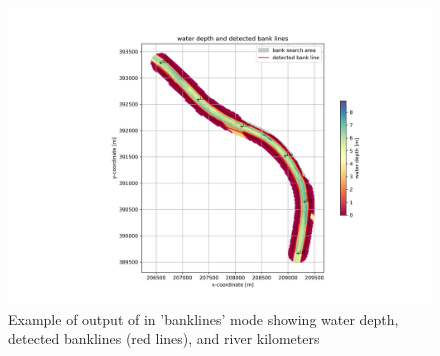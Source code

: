 \begin{figure}[!b]
\vspace*{-1cm} 
\includegraphics[width=\textwidth]{figures/1_banklinedetection.png}
\vspace*{-1cm} 
\caption{Example of output of \dfastbe in 'banklines' mode showing water depth, detected banklines (red lines), and river kilometers}
\label{Fig2.2}
\end{figure}

\pagebreak 

